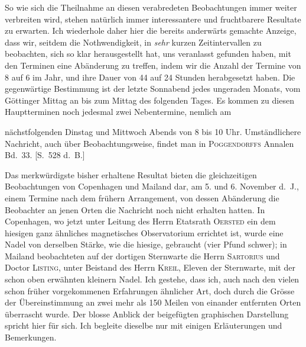 So wie sich die Theilnahme an diesen verabredeten Beobachtungen immer weiter verbreiten wird, stehen natürlich immer interessantere und fruchtbarere Resultate zu erwarten. Ich wiederhole daher hier die bereits anderwärts gemachte Anzeige, dass wir, seitdem die Nothwendigkeit, in \textit{sehr} kurzen Zeitintervallen zu beobachten, sich so klar herausgestellt hat, uns veranlasst gefunden haben, mit den Terminen eine Abänderung zu treffen, indem wir die Anzahl der Termine von 8 auf 6 im Jahr, und ihre Dauer von 44 auf 24 Stunden herabgesetzt haben. Die gegenwärtige Bestimmung ist der letzte Sonnabend jedes ungeraden Monats, vom Göttinger Mittag an bis zum Mittag des folgenden Tages. Es kommen zu diesen Hauptterminen noch jedesmal zwei Nebentermine, nemlich am
\par\clearpage
\begingroup
\renewcommand{\footnoterule}{\kern-4.35pt\hbox{\hspace{.012\columnwidth}\rule{.255\columnwidth}{.35pt}}\kern4pt}
\noindent nächstfolgenden Dinstag und Mittwoch Abends von 8 bis 10 Uhr. Umständlichere Nachricht, auch über Beobachtungsweise, findet man in \textsc{Poggendorffs} Annalen Bd.\ 33. [S.\ 528 d.\ B.]

Das merkwürdigste bisher erhaltene Resultat bieten die gleichzeitigen Beobachtungen von Copenhagen und Mailand dar, am 5. und 6. November d.\ J., einem Termine nach dem frühern Arrangement, von dessen Abänderung die Beobachter an jenen Orten die Nachricht noch nicht erhalten hatten. In Copenhagen, wo jetzt unter Leitung des Herrn Etatsrath \textsc{Oersted} ein dem hiesigen ganz ähnliches magnetisches Observatorium errichtet ist, wurde eine Nadel von derselben Stärke, wie die hiesige, gebraucht (vier Pfund schwer); in Mailand beobachteten auf der dortigen Sternwarte die Herrn \textsc{Sartorius} und Doctor \textsc{Listing}, unter Beistand des Herrn \textsc{Kreil}, Eleven der Sternwarte, mit der schon oben erwähnten kleinern Nadel. Ich gestehe, dass ich, auch nach den vielen schon früher vorgekommenen Erfahrungen ähnlicher Art, doch durch die Grösse der Übereinstimmung an zwei mehr als 150 Meilen von einander entfernten Orten überrascht wurde. Der blosse Anblick der beigefügten graphischen Darstellung spricht hier für sich. Ich begleite dieselbe nur mit einigen Erläuterungen und Bemerkungen.

